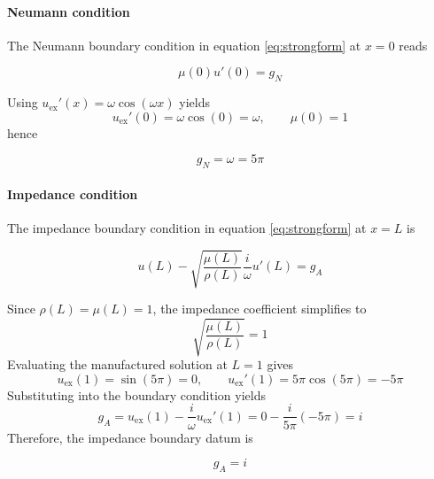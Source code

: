 \paragraph{Neumann condition} The Neumann boundary condition in equation \eqref{eq:strongform} at \(x=0\) reads

\begin{equation}
    \mu(0)u'(0) = g_N
    \label{eq:NeumannCond}
\end{equation}

Using \(u_{\mathrm{ex}}'(x) = \omega \cos(\omega x)\) yields
\[
u_{\mathrm{ex}}'(0) = \omega \cos(0) = \omega,
\qquad \mu(0)=1
\]
hence

\begin{equation}
    g_N = \omega = 5\pi
    \label{eq:gN}
\end{equation}

\paragraph{Impedance condition} The impedance boundary condition in equation \eqref{eq:strongform} at \( x =L \) is

\begin{equation}
    u(L) - \sqrt{\frac{\mu(L)}{\rho(L)}}\frac{i}{\omega}u'(L) = g_A
    \label{eq:impCond}
\end{equation}

Since \(\rho(L)=\mu(L)=1\), the impedance coefficient simplifies to
\[
\sqrt{\frac{\mu(L)}{\rho(L)}} = 1
\]
Evaluating the manufactured solution at \(L=1\) gives
\[
u_{\mathrm{ex}}(1) = \sin(5\pi) = 0,
\qquad
u_{\mathrm{ex}}'(1) = 5\pi\cos(5\pi) = -5\pi
\]
Substituting into the boundary condition yields
\[
g_A = u_{\mathrm{ex}}(1) - \frac{i}{\omega}u_{\mathrm{ex}}'(1)
    = 0 - \frac{i}{5\pi}(-5\pi)
    = i
\]
Therefore, the impedance boundary datum is

\begin{equation}
    g_A = i
    \label{eq:gA}
\end{equation}


